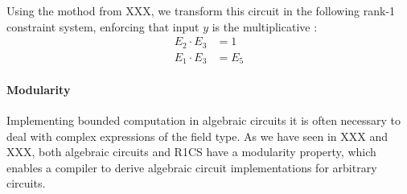 Using the mothod from XXX, we transform this circuit in the following rank-1 constraint system, enforcing that input $y$ is the multiplicative :
\begin{align*}
E_2 \cdot E_3 &= 1\\
E_1 \cdot E_3 &= E_5
\end{align*}
\paragraph{Modularity} Implementing bounded computation in algebraic circuits it is often necessary to deal with complex expressions of the field type. As we have seen in XXX and XXX, both algebraic circuits and R1CS have a modularity property, which enables a compiler to derive algebraic circuit implementations for arbitrary circuits. 
\begin{comment}
\begin{example} Consider the prime field $\F_{13}$. In this example, we want to derive an algebraic circuit and associated R1CS that enforces a pair $(x,y)\in \F_{13}^2$ to be the sum of two tiny jubjub curve points $(x_1,y_1)$ and $(x_2,y_2)$. We assume that we already know that $(x_1,x_2)$ as well as $(x_2,y_2)$ are tiny jubjub points, that is we assume that they are the inputs to valid assignments of circuit XXX. 


\end{comment}
